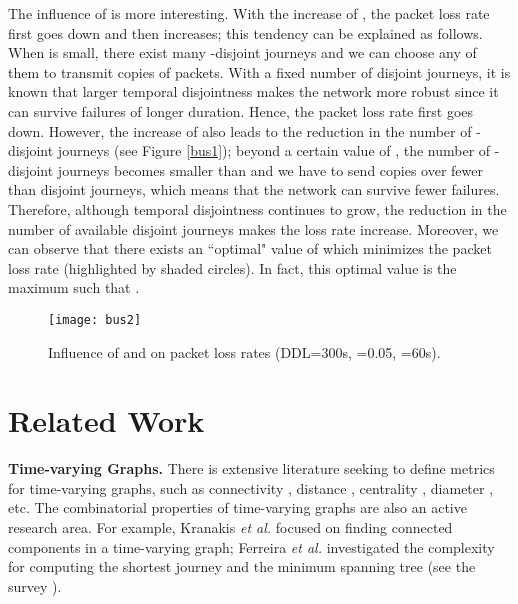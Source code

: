 \documentclass[10pt, conference, letterpaper]{IEEEtran}
\begin{document}
The influence of  is more interesting. With the increase of , the packet loss rate first goes down and then increases; this tendency can be explained as follows. When  is small, there exist many  -disjoint journeys and we can choose any  of them to transmit copies of packets. With a fixed number of disjoint journeys, it is known that larger temporal disjointness makes the network more robust since it can survive failures of longer duration. Hence, the packet loss rate first goes down. However, the increase of  also leads to the reduction in the number of -disjoint journeys (see Figure \ref{bus1}); beyond a certain value of , the number of -disjoint journeys becomes smaller than  and we have to send copies over fewer than  disjoint journeys, which means that the network can survive fewer failures. Therefore, although temporal disjointness continues to grow, the reduction in the  number of available disjoint journeys makes the loss rate increase. Moreover, we can observe that there exists an ``optimal" value of  which minimizes the packet loss rate (highlighted by shaded circles). In fact, this optimal value is the maximum  such that .

\begin{figure}[t]
\begin{center}
\texttt{[image: bus2]}
\caption{Influence of  and  on packet loss rates (DDL=300s, =0.05, =60s).}
\label{bus2}\vspace{-3mm}
\end{center}
\end{figure}










\section{Related Work}\label{related_works}
\noindent \textbf{Time-varying Graphs.}
There is extensive literature seeking to define metrics for time-varying graphs, such as connectivity \cite{TVG1, con, TVG11}, distance \cite{TVG3}, centrality \cite{TVG6, TVG7}, diameter \cite{TVG8,TVG9}, etc. The combinatorial properties of time-varying graphs are also an active research area. For example, Kranakis \emph{et al.} focused on finding connected components in a time-varying graph; Ferreira \emph{et al.} investigated the complexity for computing the shortest journey \cite{TVG3} and the minimum spanning tree \cite{TVG11} (see the survey \cite{TVG2}).
\end{document}
